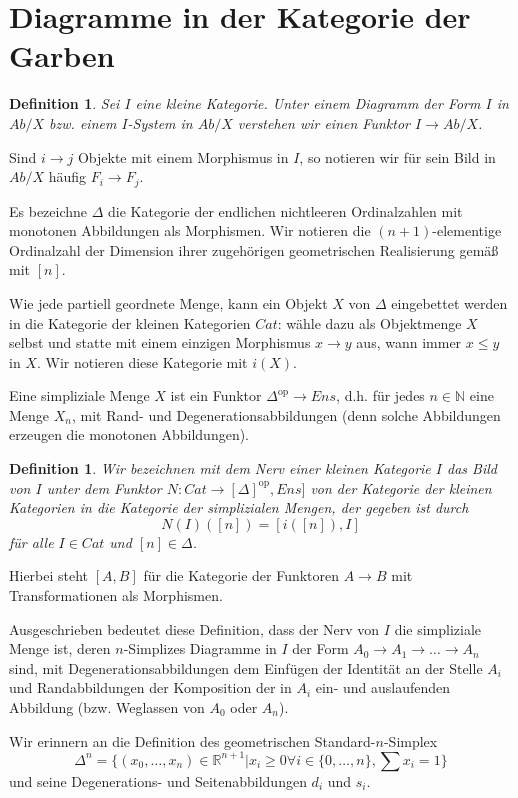 \documentclass[a4paper]{article}
\newtheorem{defn}[satz]{Definition}
\newcommand{\N}{\mathbb{N}}
\newcommand{\R}{\mathbb{R}}
\newcommand{\op}{^\mathrm{op}}
\begin{document}
\section{Diagramme in der Kategorie der Garben}

\begin{defn}
  Sei $I$ eine kleine Kategorie. Unter einem Diagramm der Form $I$ in
  $Ab/X$ bzw. einem $I$-System in $Ab/X$ verstehen wir einen Funktor $I
  \to Ab/X$.
\end{defn}

Sind $i \to j$ Objekte mit einem Morphismus in $I$, so notieren wir
für sein Bild in $Ab/X$ häufig $F_i \to F_j$.

Es bezeichne $\Delta$ die Kategorie der endlichen nichtleeren
Ordinalzahlen mit monotonen Abbildungen als Morphismen. Wir notieren
die $(n+1)$-elementige Ordinalzahl der Dimension ihrer zugehörigen
geometrischen Realisierung gemäß mit $[n]$.

Wie jede partiell geordnete Menge, kann ein Objekt $X$ von $\Delta$
eingebettet werden in die Kategorie der kleinen Kategorien $Cat$:
wähle dazu als Objektmenge $X$ selbst und statte mit einem einzigen
Morphismus $x \to y$ aus, wann immer $x \leq y$ in $X$. Wir notieren
diese Kategorie mit $i(X)$.

Eine simpliziale Menge $X$ ist ein Funktor $\Delta\op \to Ens$,
d.h. für jedes $n \in \N$ eine Menge $X_n$, mit Rand- und
Degenerationsabbildungen (denn solche Abbildungen erzeugen die
monotonen Abbildungen).

\begin{defn}
  Wir bezeichnen mit dem Nerv einer kleinen Kategorie $I$ das Bild von
  $I$ unter dem Funktor $N: Cat \to [\Delta]\op, Ens]$ von der
    Kategorie der kleinen Kategorien in die Kategorie der simplizialen
    Mengen, der gegeben ist durch $$N(I)([n]) = [i([n]), I]$$ für alle
    $I \in Cat$ und $[n] \in \Delta$.
\end{defn}

Hierbei steht $[A, B]$ für die Kategorie der Funktoren $A \to B$ mit
Transformationen als Morphismen.

Ausgeschrieben bedeutet diese Definition, dass der Nerv von $I$ die
simpliziale Menge ist, deren $n$-Simplizes Diagramme in $I$ der Form
$A_0 \to A_1 \to \dots \to A_n$ sind, mit Degenerationsabbildungen dem
Einfügen der Identität an der Stelle $A_i$ und Randabbildungen der
Komposition der in $A_i$ ein- und auslaufenden Abbildung
(bzw. Weglassen von $A_0$ oder $A_n$).

Wir erinnern an die Definition des geometrischen Standard-$n$-Simplex
$$ \Delta^n = \{(x_0, \dots, x_n) \in \R^{n+1} | x_i \geq 0 \forall
i \in \{0, \dots, n\}, \sum x_i = 1\} $$ und seine Degenerations- und
Seitenabbildungen $d_i$ und $s_i$. 
\end{document}
